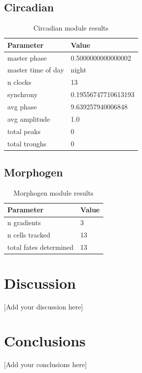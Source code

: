 \documentclass[12pt]{article}
\begin{document}
\subsection{Circadian}

\begin{table}[h]
\centering
\begin{tabular}{ll}
\toprule
Parameter & Value \\
\midrule
master phase & 0.5000000000000002 \\
master time of day & night \\
n clocks & 13 \\
synchrony & 0.19556747710613193 \\
avg phase & 9.639257940006848 \\
avg amplitude & 1.0 \\
total peaks & 0 \\
total troughs & 0 \\
\bottomrule
\end{tabular}
\caption{Circadian module results}
\end{table}

\subsection{Morphogen}

\begin{table}[h]
\centering
\begin{tabular}{ll}
\toprule
Parameter & Value \\
\midrule
n gradients & 3 \\
n cells tracked & 13 \\
total fates determined & 13 \\
\bottomrule
\end{tabular}
\caption{Morphogen module results}
\end{table}


\section{Discussion}

[Add your discussion here]

\section{Conclusions}

[Add your conclusions here]
\end{document}
